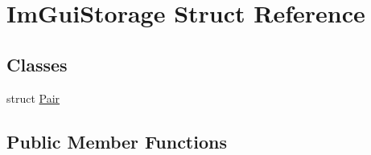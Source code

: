 \hypertarget{struct_im_gui_storage}{}\section{Im\+Gui\+Storage Struct Reference}
\label{struct_im_gui_storage}
\subsection*{Classes}
\begin{DoxyCompactItemize}
\item 
struct \hyperlink{struct_im_gui_storage_1_1_pair}{Pair}
\end{DoxyCompactItemize}
\subsection*{Public Member Functions}
